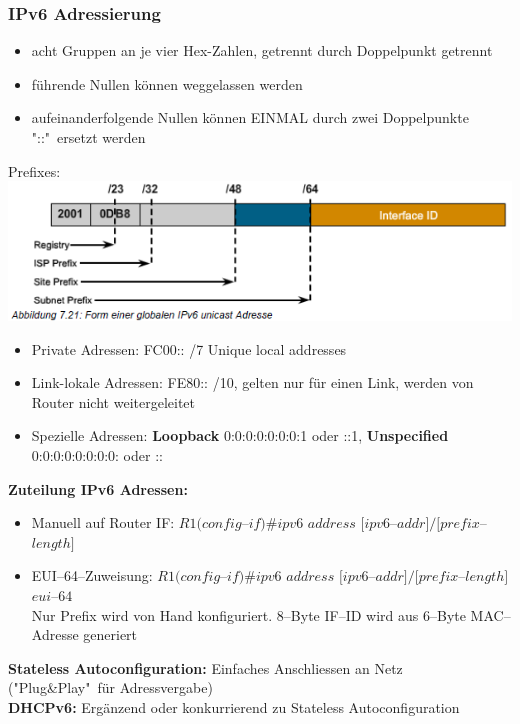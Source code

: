 \documentclass[landscape,twocolumn,a4paper]{article}
\begin{document}
\begin{footnotesize}
\subsubsection{IPv6 Adressierung}
\begin{itemize}
	\item acht Gruppen an je vier Hex-Zahlen, getrennt durch Doppelpunkt getrennt
	\item führende Nullen können weggelassen werden
	\item aufeinanderfolgende Nullen können EINMAL durch zwei Doppelpunkte "::"\ ersetzt werden
\end{itemize}
\vspace{-3mm}
Prefixes:\\
\includegraphics[scale=0.5]{ipv6-prefixes.png}\\
\vspace{-3mm}
\begin{itemize}
	\item Private Adressen: FC00:: /7 Unique local addresses
	\item Link-lokale Adressen: FE80:: /10, gelten nur für einen Link, werden von Router nicht weitergeleitet
	\item Spezielle Adressen: \textbf{Loopback} 0:0:0:0:0:0:0:1 oder ::1, \textbf{Unspecified} 0:0:0:0:0:0:0:0: oder ::
\end{itemize}
\vspace{-3mm}
\textbf{Zuteilung IPv6 Adressen:}
\vspace{-3mm}
\begin{itemize}
	\item Manuell auf Router IF: $R1(config$--$if)\#ipv6$ $address$ $[ipv6$--$addr]/[prefix$--$length]$
	\item EUI--64--Zuweisung: $R1(config$--$if)\#ipv6$ $address$ $[ipv6$--$addr]/[prefix$--$length]$ $eui$--$64$\\
	Nur Prefix wird von Hand konfiguriert. 8--Byte IF--ID wird aus 6--Byte MAC--Adresse generiert
\end{itemize}
\vspace{-3mm}
\textbf{Stateless Autoconfiguration:} Einfaches Anschliessen an Netz ("Plug\&Play"\ für Adressvergabe)\\
\textbf{DHCPv6:} Ergänzend oder konkurrierend zu Stateless Autoconfiguration

\end{footnotesize}
\end{document}
